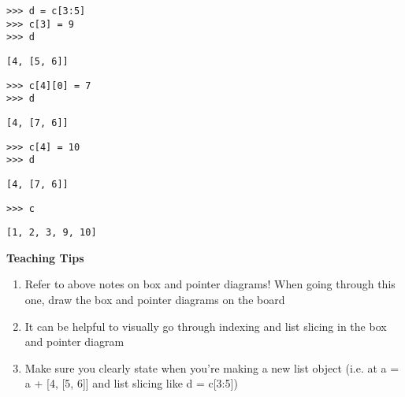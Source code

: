 \begin{blocksection}

\begin{lstlisting}
>>> d = c[3:5]
>>> c[3] = 9
>>> d

\end{lstlisting}
\begin{solution}[.25in]
\begin{lstlisting}
[4, [5, 6]]
\end{lstlisting}
\end{solution}

\begin{lstlisting}
>>> c[4][0] = 7
>>> d
\end{lstlisting}
\begin{solution}[.25in]
\begin{lstlisting}
[4, [7, 6]]
\end{lstlisting}
\end{solution}

\begin{lstlisting}
>>> c[4] = 10
>>> d
\end{lstlisting}
\begin{solution}[.25in]
\begin{lstlisting}
[4, [7, 6]]
\end{lstlisting}
\end{solution}

\begin{lstlisting}
>>> c
\end{lstlisting}
\begin{solution}[.25in]
\begin{lstlisting}
[1, 2, 3, 9, 10]
\end{lstlisting}
\end{solution}

\end{blocksection}

\begin{blocksection}
	\begin{guide}
	\textbf{Teaching Tips}
	\begin{enumerate}
			\item Refer to above notes on box and pointer diagrams! When going through this one, draw the box and pointer diagrams on the board
            \item It can be helpful to visually go through indexing and list slicing in the box and pointer diagram
            \item Make sure you clearly state when you’re making a new list object (i.e. at a = a + [4, [5, 6]] and list slicing like d = c[3:5])
	\end{enumerate}
	\end{guide}
\end{blocksection}